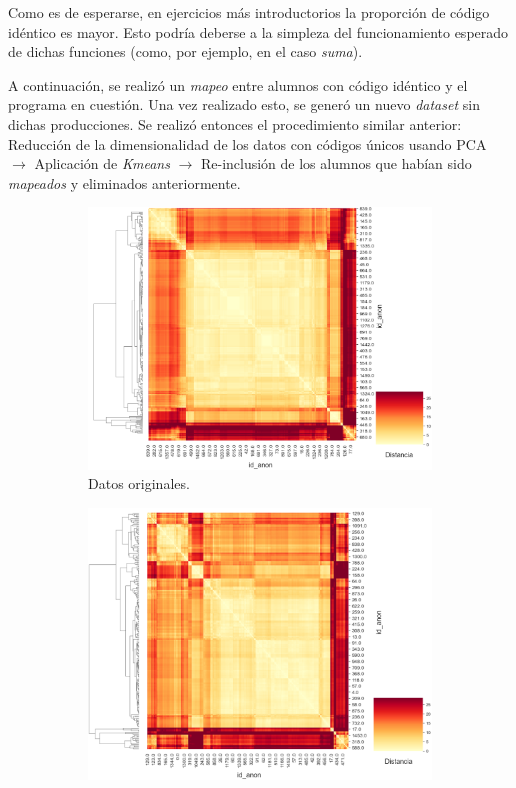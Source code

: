 \documentclass[11pt,a4paper,twoside,openany]{tesis}
\begin{document}
Como es de esperarse, en ejercicios más introductorios la proporción de código idéntico es mayor. Esto podría deberse a la simpleza del funcionamiento esperado de dichas funciones (como, por ejemplo, en el caso \emph{suma}).

A continuación, se realizó un \emph{mapeo} entre alumnos con código idéntico y el programa en cuestión. Una vez realizado esto, se generó un nuevo \emph{dataset} sin dichas producciones. Se realizó entonces el procedimiento similar anterior: Reducción de la dimensionalidad de los datos con códigos únicos usando PCA $\rightarrow$ Aplicación de \emph{Kmeans} $\rightarrow$ Re-inclusión de los alumnos que habían sido \emph{mapeados} y eliminados anteriormente.

\begin{figure}[H]
    \centering
    \begin{subfigure}{0.45\textwidth}
        \includegraphics[width=\linewidth]{imagenes/codigo-reptido-original.png}
        \caption{Datos originales.}
        \label{fig:figura3}
    \end{subfigure}
    \hfill
    \begin{subfigure}{0.45\textwidth}
        \includegraphics[width=\linewidth]{imagenes/codigo-reptido-uniques.png}

\end{subfigure}
\end{figure}
\end{document}
